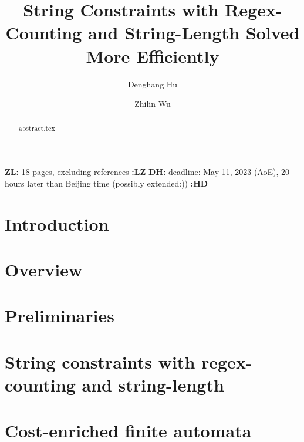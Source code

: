 \documentclass[runningheads]{llncs}
\newcommand{\zhilin}[1]{\color{orange}\textbf{ZL:} #1 \textbf{:LZ}\color{black}}
\newcommand{\denghang}[1]{{\color{teal}\textbf{DH:} #1 \textbf{:HD}\color{black}}}
\begin{document}
\title{String Constraints with Regex-Counting and String-Length Solved More Efficiently}

\author{Denghang Hu \and
  Zhilin Wu}


\maketitle

\begin{abstract}
{abstract.tex}
\end{abstract}

\zhilin{18 pages, excluding references}\newline
\denghang{deadline: May 11, 2023 (AoE), 20 hours later than Beijing time (possibly extended:))}

\section{Introduction} \label{sec:intro}


\section{Overview} \label{sec:overview}


\section{Preliminaries} \label{sec:pre}


\section{String constraints with regex-counting and string-length}



\section{Cost-enriched finite automata} \label{sec:automaton}

\end{document}

